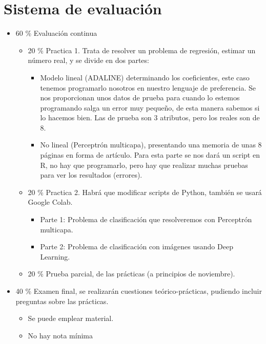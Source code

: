 \documentclass[12pt, twoside, openright]{report} %
\begin{document}
\section{Sistema de evaluación}
\begin{itemize}
	\item 60 \% Evaluación continua
	      \begin{itemize}
		      \item 20 \% Practica 1. Trata de resolver un problema de regresión, estimar un número real, y se divide en dos partes:
		            \begin{itemize}
			            \item Modelo lineal (ADALINE) determinando los coeficientes, este caso tenemos programarlo nosotros en nuestro lenguaje de preferencia.
			                  Se nos proporcionan unos datos de prueba para cuando lo estemos programando salga un error muy pequeño, de esta manera sabemos si lo hacemos bien. Las de prueba son 3 atributos, pero los reales son de 8.
			            \item No lineal (Perceptrón multicapa), presentando una memoria de unas 8 páginas en forma de artículo.
			                  Para esta parte se nos dará un script en R, no hay que programarlo, pero hay que realizar muchas pruebas para ver los resultados (errores).
		            \end{itemize}
		      \item 20 \% Practica 2. Habrá que modificar scripts de Python, también se usará Google Colab.
		            \begin{itemize}
			            \item Parte 1: Problema de clasificación que resolveremos con Perceptrón multicapa.
			            \item Parte 2: Problema de clasificación con imágenes usando Deep Learning.
		            \end{itemize}
		      \item 20 \% Prueba parcial, de las prácticas (a principios de noviembre).
	      \end{itemize}
	\item 40 \% Examen final, se realizarán cuestiones teórico-prácticas, pudiendo incluir preguntas sobre las prácticas.
	      \begin{itemize}
		      \item Se puede emplear material.
		      \item No hay nota mínima
	      \end{itemize}
\end{itemize}
\end{document}

